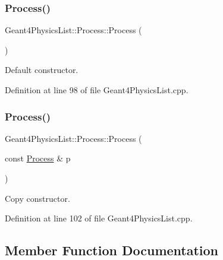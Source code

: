 \subsubsection{\texorpdfstring{Process()}{Process()}\hspace{0.1cm}{\footnotesize\ttfamily [1/2]}}
{\footnotesize\ttfamily Geant4\+Physics\+List\+::\+Process\+::\+Process (\begin{DoxyParamCaption}{ }\end{DoxyParamCaption})}



Default constructor. 



Definition at line 98 of file Geant4\+Physics\+List.\+cpp.

\hypertarget{class_d_d4hep_1_1_simulation_1_1_geant4_physics_list_1_1_process_a8a359fff64fa6b38ca4e8c26f55d82de}{}\label{class_d_d4hep_1_1_simulation_1_1_geant4_physics_list_1_1_process_a8a359fff64fa6b38ca4e8c26f55d82de} 
\subsubsection{\texorpdfstring{Process()}{Process()}\hspace{0.1cm}{\footnotesize\ttfamily [2/2]}}
{\footnotesize\ttfamily Geant4\+Physics\+List\+::\+Process\+::\+Process (\begin{DoxyParamCaption}\item[{const \hyperlink{class_d_d4hep_1_1_simulation_1_1_geant4_physics_list_1_1_process}{Process} \&}]{p }\end{DoxyParamCaption})}



Copy constructor. 



Definition at line 102 of file Geant4\+Physics\+List.\+cpp.



\subsection{Member Function Documentation}
\hypertarget{class_d_d4hep_1_1_simulation_1_1_geant4_physics_list_1_1_process_a979605cdba461548a4a86b9574ab4e60}{}\label{class_d_d4hep_1_1_simulation_1_1_geant4_physics_list_1_1_process_a979605cdba461548a4a86b9574ab4e60} 
